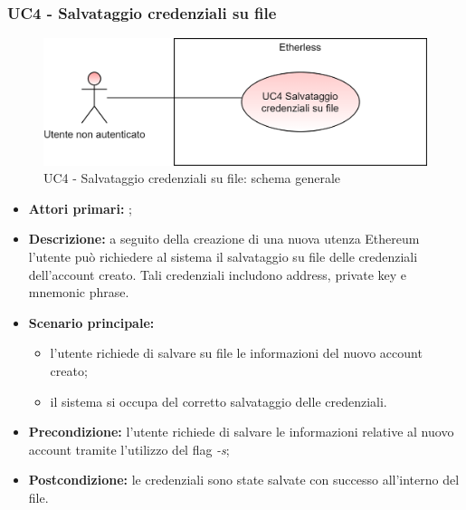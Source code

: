 \subsubsection{UC4 - Salvataggio credenziali su file}
\begin{figure}[h]
	\centering
	\includegraphics[scale=\ucs]{./res/img/UC4G.png}
	\caption {UC4 - Salvataggio credenziali su file: schema generale}
\end{figure}
\begin{itemize}
	\item \textbf{Attori primari:} \una{};
	\item \textbf{Descrizione:} a seguito della creazione di una nuova utenza Ethereum l’utente può richiedere al sistema il salvataggio su file delle credenziali dell’account creato. Tali credenziali includono address, private key e mnemonic phrase.
	\item \textbf{Scenario principale:}
	\begin{itemize}
		\item l’utente richiede di salvare su file le informazioni del nuovo account creato; 
		\item il sistema si occupa del corretto salvataggio delle credenziali. 
	\end{itemize}
	\item \textbf{Precondizione:} l’utente richiede di salvare le informazioni relative al nuovo account tramite l’utilizzo del flag \textit{-s};  
	\item \textbf{Postcondizione:} le credenziali sono state salvate con successo all’interno del file.  
\end{itemize}